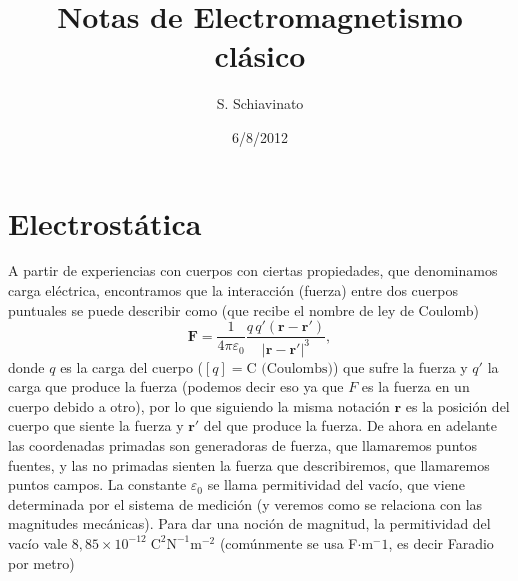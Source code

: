 \documentclass[11pt,a4paper]{article}
\title{Notas de Electromagnetismo clásico}
\author{S. Schiavinato}
\date{6/8/2012}
\numberwithin{equation}{section}
\begin{document}
\maketitle
\tableofcontents
\section{Electrostática}
\label{sec:e_estatica}
A partir de experiencias con cuerpos con ciertas propiedades, que denominamos carga eléctrica, encontramos que la interacción (fuerza) entre dos cuerpos puntuales se puede describir como (que recibe el nombre de ley de Coulomb)
\begin{equation}
    \textbf{F} = \frac{1}{4\pi\varepsilon_0}\frac{q\,q'(\textbf{r}-\textbf{r}')}{|\textbf{r}-\textbf{r}'|^{3}},
    \label{eq:coulomb}
\end{equation}
donde $q$ es la carga del cuerpo ($[q] = \text{C (Coulombs)}$) que sufre la fuerza y $q'$ la carga que produce la fuerza (podemos decir eso ya que $F$ es la fuerza en un cuerpo debido a otro), por lo que siguiendo la misma notación $\textbf{r}$ es la posición del cuerpo que siente la fuerza y $\textbf{r}'$ del que produce la fuerza.  De ahora en adelante las coordenadas primadas son generadoras de fuerza, que llamaremos puntos fuentes, y las no primadas sienten la fuerza que describiremos, que llamaremos puntos campos. La constante $\varepsilon_0$ se llama permitividad del vacío, que viene determinada por el sistema de medición (y veremos como se relaciona con las magnitudes mecánicas). Para dar una noción de magnitud, la permitividad del vacío vale $8,85\times10^{-12} \; \text{C}^2\text{N}^{-1} \text{m}^{-2}$ (comúnmente se usa F$\cdot$m$^-1$, es decir Faradio por metro)
\end{document}
